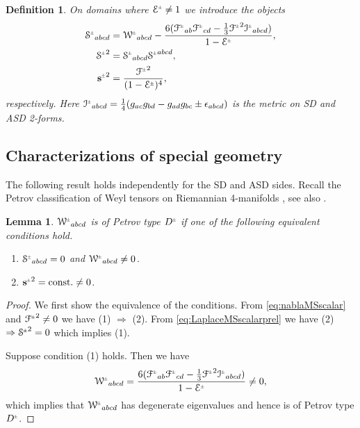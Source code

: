\documentclass[a4paper,10pt,reqno]{amsart}
\newcommand{\Scal}{\mathop{\rm Scal}}
\theoremstyle{plain}
\newtheorem{lemma}[thm]{Lemma}
\newtheorem{definition}[thm]{Definition}
\newcommand{\PM}[1]{{{#1}^{\hspace{-.5pt}\scaleto{\pm}{3.5pt}}}}
\def\Wcal{\mathcal{W}}
\def\Fcal{\mathcal{F}}
\def\Ecal{\mathcal{E}}
\def\Scal{\mathcal{S}}
\def\Ical{\mathcal{I}}
\def\sbold{\mathbf{s}}
\numberwithin{equation}{section}
\begin{document}
\begin{definition}\label{def:mst}
On domains where $\PM{\Ecal} \neq 1$ we introduce the objects
\begin{subequations}
\begin{align}
\PM{\Scal}_{abcd}={}&\PM{\Wcal}_{abcd} - \frac{6 (\PM{\Fcal}_{ab} \PM{\Fcal}_{cd} -  \tfrac{1}{3} \PM{\Fcal}^2 \PM{\Ical}_{abcd})}{1 -  \PM{\Ecal}},  \label{mst}\\
\PM{\Scal}^2={}&\PM{\Scal}_{abcd} \PM{\Scal}^{abcd}, \\
\PM{\sbold}^2={}&\frac{\PM{\Fcal}^2}{(1 -  \PM{\Ecal})^4}, \label{eq:MSscalar}
\end{align}
\end{subequations}
respectively. Here $\PM{\Ical}_{abcd}= \tfrac{1}{4} ( g_{ac} g_{bd} -  g_{ad} g_{bc} \pm \epsilon_{abcd} )$ is the metric on SD and ASD 2-forms.
\end{definition}

\subsection{Characterizations of special geometry} 
The following result holds independently for the SD and ASD sides. Recall the Petrov classification of Weyl tensors on Riemannian 4-manifolds \cite{karlhede:1986}, see also \cite{PR:II,MR4809333}.
\begin{lemma} \label{lem:typeDchar}
$\PM{\Wcal}_{abcd} $ is of Petrov type $\PM{D}$ if one of the following equivalent conditions hold.
\begin{enumerate}
\item $\PM{\Scal}_{abcd} = 0$ and $\PM{\Wcal}_{abcd} \neq 0$.
\item $\PM{\sbold}^2 = \text{const.} \neq 0$.
\end{enumerate}
\end{lemma}
\begin{proof}
We first show the equivalence of the conditions. From \eqref{eq:nablaMSscalar} and $\PM{\Fcal}^2 \neq0$ we have (1) $\Rightarrow$ (2). From \eqref{eq:LaplaceMSscalarprel} we have (2) $\Rightarrow \PM{\Scal}^2 = 0$ which implies (1).

Suppose condition (1) holds. Then we have
\begin{align}
\PM{\Wcal}_{abcd} = \frac{6 (\PM{\Fcal}_{ab} \PM{\Fcal}_{cd} -  \tfrac{1}{3} \PM{\Fcal}^2 \PM{\Ical}_{abcd})}{1 -  \PM{\Ecal}} \neq 0, 
\end{align}
which implies that $\PM{\Wcal}_{abcd}$ has degenerate eigenvalues and hence is of Petrov type $\PM{D}$.
\end{proof}
\end{document}
